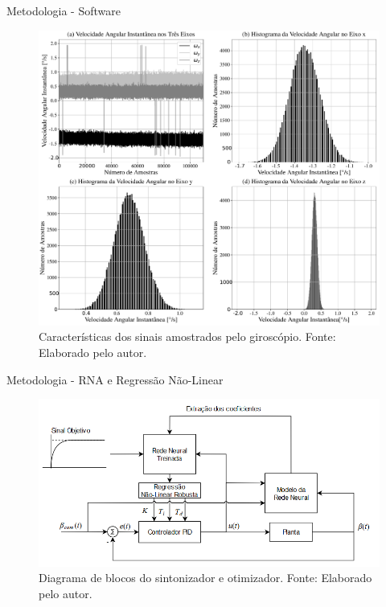 \documentclass{beamer}
\begin{document}

\begin{frame}{Metodologia - Software}
    \begin{figure}[HT]
		\begin{center}
		\captionsetup{justification=centering}
        \includegraphics[scale=.17]{../metodologia/img/bias_correction}
        \caption{Características dos sinais amostrados pelo giroscópio. \newline
        		 Fonte: Elaborado pelo autor.}
		\label{FIG_ADAPTATIVO}
        \end{center}
	\end{figure}
\end{frame}


\begin{frame}{Metodologia - RNA e Regressão Não-Linear}
    \begin{figure}[HT]
		\begin{center}
		\captionsetup{justification=centering}
        \includegraphics[scale=.5]{../metodologia/img/neural_regression}
        \caption{Diagrama de blocos do sintonizador e otimizador. \newline
        		 Fonte: Elaborado pelo autor.}
		\label{fig:neural_regression}
        \end{center}
	\end{figure}
\end{frame}
\end{document}
